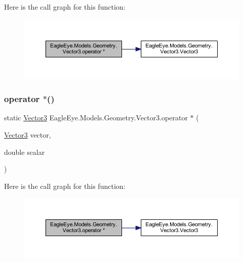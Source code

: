 Here is the call graph for this function\+:\nopagebreak
\begin{figure}[H]
\begin{center}
\leavevmode
\includegraphics[width=350pt]{struct_eagle_eye_1_1_models_1_1_geometry_1_1_vector3_a9f3e3781e02fb262c08fe8504caa3824_cgraph}
\end{center}
\end{figure}
\mbox{\label{struct_eagle_eye_1_1_models_1_1_geometry_1_1_vector3_a05403fd877ca57a367bd4e2a4d321ea5}} 
\subsubsection{\texorpdfstring{operator $\ast$()}{operator *()}\hspace{0.1cm}{\footnotesize\ttfamily [2/2]}}
{\footnotesize\ttfamily static \mbox{\hyperlink{struct_eagle_eye_1_1_models_1_1_geometry_1_1_vector3}{Vector3}} Eagle\+Eye.\+Models.\+Geometry.\+Vector3.\+operator $\ast$ (\begin{DoxyParamCaption}\item[{\mbox{\hyperlink{struct_eagle_eye_1_1_models_1_1_geometry_1_1_vector3}{Vector3}}}]{vector,  }\item[{double}]{scalar }\end{DoxyParamCaption})\hspace{0.3cm}{\ttfamily [static]}}

Here is the call graph for this function\+:\nopagebreak
\begin{figure}[H]
\begin{center}
\leavevmode
\includegraphics[width=350pt]{struct_eagle_eye_1_1_models_1_1_geometry_1_1_vector3_a05403fd877ca57a367bd4e2a4d321ea5_cgraph}
\end{center}
\end{figure}
\mbox{\label{struct_eagle_eye_1_1_models_1_1_geometry_1_1_vector3_abe683a8c17b442bbe4c9d86a8af44be2}} 
